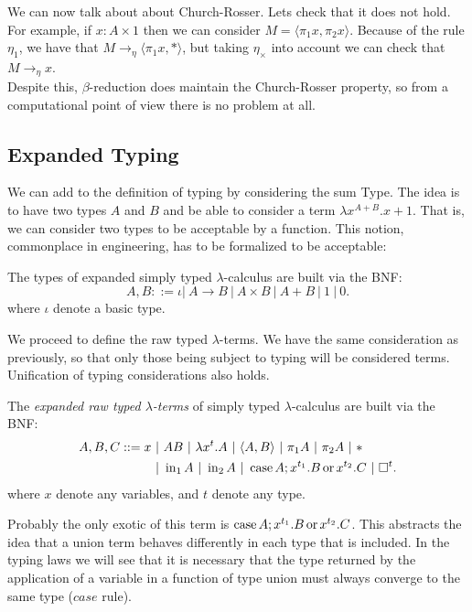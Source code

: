 We can now talk about about Church-Rosser.  Lets check that it does not hold. For example, if $x: A\times 1$ then we can consider $M=\langle \pi_1x, \pi_2x\rangle$. Because of the rule $\eta_1$, we have that $M \to_{\eta}\langle \pi_1 x, *\rangle$, but taking $\eta_\times$ into account we can check that $M \to_{\eta} x$. \\

Despite this, $\beta$-reduction does maintain the Church-Rosser property, so from a computational point of view there is no problem at all.

\subsection{Expanded Typing}

We can add to the definition of typing by considering the sum Type. The idea is to have two types $A$ and $B$ and be able to consider a term $\lambda x^{A+B}. x+1$. That is, we can consider two types to be acceptable by a function. This notion, commonplace in engineering, has to be formalized to be acceptable:

\begin{definition}
  The types of expanded simply typed $\lambda$-calculus are built via the BNF:
  $$A,B ::= \iota |\ A\to B\ |\ A \times B \ |\ A + B  \ |\ 1\ |\ 0.$$
  where $\iota$ denote a basic type. 
\end{definition}

We proceed to define the raw typed $\lambda$-terms. We have the same consideration as previously, so that only those being subject to typing will be considered terms. Unification of typing considerations also holds.
\begin{definition}
  The \emph{expanded raw typed $\lambda$-terms} of simply typed $\lambda$-calculus are built via the BNF:
  \begin{align*}
    A,B, C ::= x\ &|\ AB\ |\ \lambda x^t.A \ |\ \langle A,B \rangle\ |\ \pi_1A\ |\ \pi_2A\ |\ * \\
               &|\ \iin_1 A\ |\ \iin_2 A \ |\ \ccase A ; x^{t_1}.B\oo x^{t_2}.C \ |\ \square^t. 
  \end{align*}
  where $x$ denote any variables, and $t$ denote any type. 
\end{definition}

Probably the only exotic of this term is $\operatorname{case} A ; x^{t_1}.B\operatorname{ or } x^{t_2}.C$. This abstracts the idea that a union term behaves differently in each type that is included. In the typing laws we will see that it is necessary that the type returned by the application of a variable in a function of type union must always converge to the same type ($case$ rule).\\

